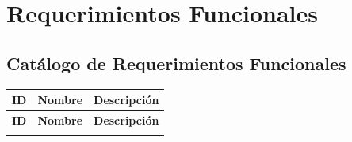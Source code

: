\chapter{Requerimientos Funcionales}

\section{Catálogo de Requerimientos Funcionales}

\begin{longtable}{|C{1cm}|L{4.5cm}|L{8cm}|}
    \hline
    \textbf{ID} & \textbf{Nombre} & \textbf{Descripción} \\
    \hline
    \endfirsthead
    \hline
    \textbf{ID} & \textbf{Nombre} & \textbf{Descripción} \\
    \hline
    \endhead
    \hline
    \endfoot


\end{longtable}

